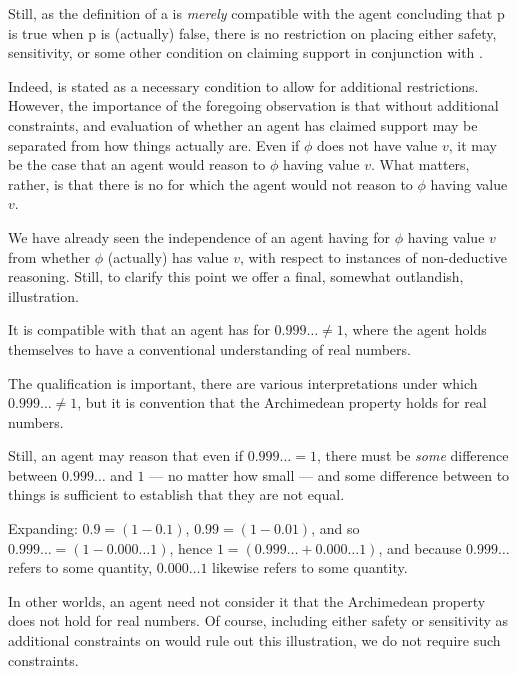 \begin{note}
  Still, as the definition of a \sink{} is \emph{merely} compatible with the agent concluding that p is true when p is (actually) false, there is no restriction on placing either safety, sensitivity, or some other condition on claiming support in conjunction with \ideaS{}.

  Indeed, \ideaS{} is stated as a necessary condition to allow for additional restrictions.
  However, the importance of the foregoing observation is that without additional constraints, and evaluation of whether an agent has claimed support may be separated from how things actually are.
  Even if \(\phi\) does not have value \(v\), it may be the case that an agent would reason to \(\phi\) having value \(v\).
  What matters, rather, is that there is no \epPN{} for which the agent would not reason to \(\phi\) having value \(v\).
\end{note}

\begin{note}
  We have already seen the independence of an agent having \support{} for \(\phi\) having value \(v\) from whether \(\phi\) (actually) has value \(v\), with respect to instances of non-deductive reasoning.
  Still, to clarify this point we offer a final, somewhat outlandish, illustration.

  \begin{illustration}
    It is compatible with \ideaS{} that an agent has \support{} for \(0.999\dots \ne 1\), where the agent holds themselves to have a conventional understanding of real numbers.
  \end{illustration}
  The qualification is important, there are various interpretations under which \(0.999\dots \ne 1\), but it is convention that the Archimedean property holds for real numbers.

  Still, an agent may reason that even if \(0.999\dots = 1\), there must be \emph{some} difference between \(0.999\dots\) and \(1\) --- no matter how small --- and some difference between to things is sufficient to establish that they are not equal.

  Expanding: \(0.9 = (1 - 0.1)\), \(0.99 = (1 - 0.01)\), and so \(0.999\dots = (1 - 0.000\dots 1)\), hence \(1 = (0.999\dots + 0.000\dots 1)\), and because \(0.999\dots\) refers to some quantity, \(0.000\dots 1\) likewise refers to some quantity.

  In other worlds, an agent need not consider it \epPAd{} that the Archimedean property does not hold for real numbers.
  Of course, including either safety or sensitivity as additional constraints on \support{} would rule out this illustration, we do not require such constraints.
\end{note}

